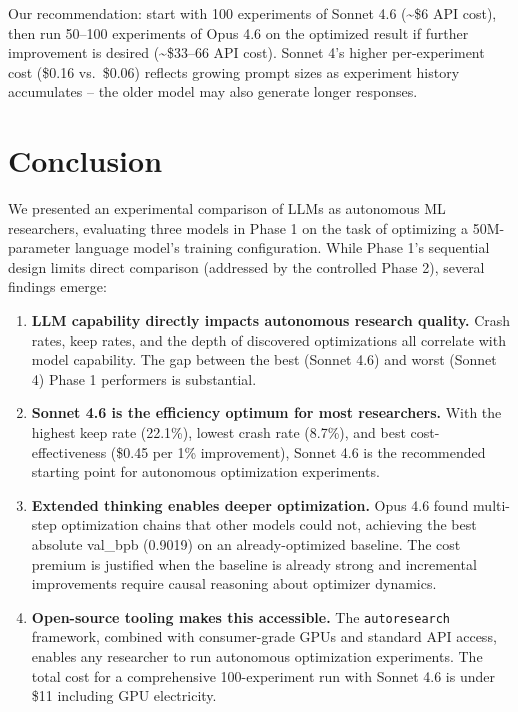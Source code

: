 \documentclass[11pt]{article}
\begin{document}
Our recommendation: start with 100 experiments of Sonnet 4.6 (\textasciitilde\$6 API cost), then run 50--100 experiments of Opus 4.6 on the optimized result if further improvement is desired (\textasciitilde\$33--66 API cost). Sonnet 4's higher per-experiment cost (\$0.16 vs.\ \$0.06) reflects growing prompt sizes as experiment history accumulates -- the older model may also generate longer responses.

\section{Conclusion}
\label{sec:conclusion}

We presented an experimental comparison of LLMs as autonomous ML researchers, evaluating three models in Phase 1 on the task of optimizing a 50M-parameter language model's training configuration. While Phase 1's sequential design limits direct comparison (addressed by the controlled Phase 2), several findings emerge:

\begin{enumerate}[leftmargin=*]
    \item \textbf{LLM capability directly impacts autonomous research quality.} Crash rates, keep rates, and the depth of discovered optimizations all correlate with model capability. The gap between the best (Sonnet 4.6) and worst (Sonnet 4) Phase 1 performers is substantial.

    \item \textbf{Sonnet 4.6 is the efficiency optimum for most researchers.} With the highest keep rate (22.1\%), lowest crash rate (8.7\%), and best cost-effectiveness (\$0.45 per 1\% improvement), Sonnet 4.6 is the recommended starting point for autonomous optimization experiments.

    \item \textbf{Extended thinking enables deeper optimization.} Opus 4.6 found multi-step optimization chains that other models could not, achieving the best absolute val\_bpb (0.9019) on an already-optimized baseline. The cost premium is justified when the baseline is already strong and incremental improvements require causal reasoning about optimizer dynamics.

    \item \textbf{Open-source tooling makes this accessible.} The \texttt{autoresearch} framework, combined with consumer-grade GPUs and standard API access, enables any researcher to run autonomous optimization experiments. The total cost for a comprehensive 100-experiment run with Sonnet 4.6 is under \$11 including GPU electricity.
\end{enumerate}
\end{document}

